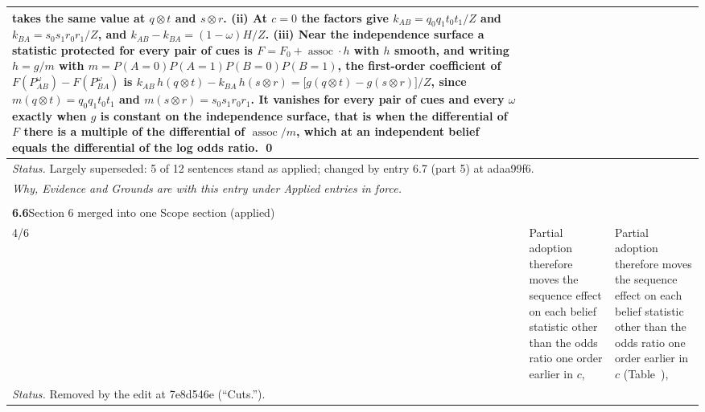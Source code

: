 \documentclass[10pt]{article}
\theoremstyle{definition}
\newcommand{\assoc}{\operatorname{assoc}}
\renewcommand{\ref}[1]{\textsc{\detokenize{#1}}}
\newlength{\fullw}\setlength{\fullw}{25.9cm}
\newcommand{\entryhead}[2]{\multicolumn{3}{|l|}{\rule{0pt}{2.6ex}\large\textbf{#1}\quad #2} \\ \hline}
\begin{document}
{\begin{longtable}{|p{0.9cm}|p{12.2cm}|p{12.2cm}|}
takes the same value at $q\otimes t$ and $s\otimes r$. (ii) At $c=0$ the factors give $k_{AB}=q_0q_1t_0t_1/Z$ and $k_{BA}=s_0s_1r_0r_1/Z$, and $k_{AB}-k_{BA}=(1-\omega)H/Z$. (iii) Near the independence surface a statistic protected for every pair of cues is $F=F_0+\assoc\cdot h$ with $h$ smooth, and writing $h=g/m$ with $m=P(A{=}0)P(A{=}1)P(B{=}0)P(B{=}1)$, the first-order coefficient of $F(P^{\omega}_{AB})-F(P^{\omega}_{BA})$ is $k_{AB}\,h(q\otimes t)-k_{BA}\,h(s\otimes r)=\bigl[g(q\otimes t)-g(s\otimes r)\bigr]/Z$, since $m(q\otimes t)=q_0q_1t_0t_1$ and $m(s\otimes r)=s_0s_1r_0r_1$. It vanishes for every pair of cues and every $\omega$ exactly when $g$ is constant on the independence surface, that is when the differential of $F$ there is a multiple of the differential of $\assoc/m$, which at an independent belief equals the differential of the log odds ratio. \qed \\ \hline
\multicolumn{3}{|p{\fullw}|}{\textit{Status.} Largely superseded: 5 of 12 sentences stand as applied; changed by entry 6.7 (part 5) at adaa99f6.} \\ \hline
\multicolumn{3}{|p{\fullw}|}{\textit{Why, Evidence and Grounds are with this entry under Applied entries in force.}} \\ \hline
\multicolumn{3}{|l|}{} \\ \hline
\entryhead{6.6}{Section 6 merged into one Scope section (applied)\quad{\footnotesize\textit{(formerly C.22)}}}
4/6 & Partial adoption therefore moves the sequence effect on each belief statistic other than the odds ratio one order earlier in $c$, & Partial adoption therefore moves the sequence effect on each belief statistic other than the odds ratio one order earlier in $c$ (Table~\ref{tab:robust}), \\ \hline
\multicolumn{3}{|p{\fullw}|}{\textit{Status.} Removed by the edit at 7e8d546e (``Cuts.'').} \\ \hline

\end{longtable}}
\end{document}
